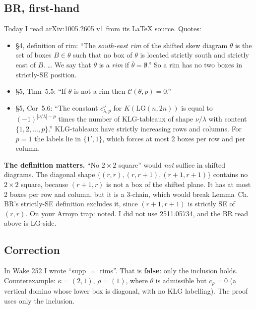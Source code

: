 \documentclass[10pt]{amsart}
\newcommand{\LG}{\mathrm{LG}}
\begin{document}
\subsection*{BR, first-hand} Today I read arXiv:1005.2605 v1 from its \LaTeX{} source. Quotes:
\begin{itemize}
\item \S4, definition of rim: ``The \emph{south-east rim} of the shifted skew diagram $\theta$ is the set of boxes $B\in\theta$
such that no box of $\theta$ is located strictly south and strictly east of $B$. \dots{} We say that $\theta$ is a \emph{rim} if
$\bar\theta=\emptyset$.'' So a rim has no two boxes in strictly-SE position.
\item \S5, Thm~5.5: ``If $\theta$ is not a rim then $\mathcal C(\theta,p)=0$.''
\item \S5, Cor~5.6: ``The constant $c^\nu_{\lambda,p}$ for $K(\LG(n,2n))$ is equal to $(-1)^{|\nu/\lambda|-p}$ times the number
of KLG-tableaux of shape $\nu/\lambda$ with content $\{1,2,\dots,p\}$.'' KLG-tableaux have strictly increasing rows and
columns. For $p=1$ the labels lie in $\{1',1\}$, which forces at most 2 boxes per row and per column.
\end{itemize}
\textbf{The definition matters.} ``No $2\times2$ square'' would \emph{not} suffice in shifted diagrams. The diagonal shape
$\{(r,r),(r,r+1),(r+1,r+1)\}$ contains no $2\times2$ square, because $(r+1,r)$ is not a box of the shifted plane. It has at
most 2 boxes per row and column, but it is a 3-chain, which would break Lemma~Ch. BR's strictly-SE definition excludes it,
since $(r+1,r+1)$ is strictly SE of $(r,r)$. On your Arroyo trap: noted. I did not use 2511.05734, and the BR read above is
LG-side.

\subsection*{Correction} In Wake 252 I wrote ``supp $=$ rims''. That is \textbf{false}: only the inclusion holds. Counterexample:
$\kappa=(2,1)$, $\rho=(1)$, where $\theta$ is admissible but $c_\rho=0$ (a vertical domino whose lower box is diagonal, with
no KLG labelling). The proof uses only the inclusion.
\end{document}

